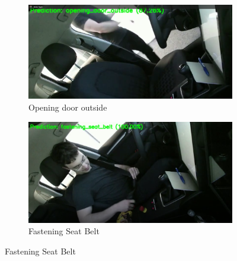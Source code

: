 \documentclass{article}
\begin{document}
\begin{figure}[h]
    \centering
    \begin{subfigure}{0.45\textwidth}
        \centering
        \includegraphics[width=\textwidth]{figs/DAR1.png}
        \caption{Opening door outside}
    \end{subfigure}
    \hspace{0.5cm}
    \begin{subfigure}{0.45\textwidth}
        \centering
        \includegraphics[width=\textwidth]{figs/DAR2.png}
        \caption{Fastening Seat Belt}
    \end{subfigure}

    \vspace{0.5cm}


\end{figure}
\end{document}
